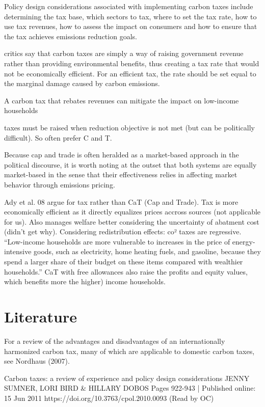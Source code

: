 \documentclass[version=3.21, pagesize, twoside=off, bibliography=totoc, DIV=calc, fontsize=12pt, a4paper, french, english]{scrartcl}
\begin{document}
Policy design considerations associated with implementing carbon taxes
include determining the tax base, which sectors to tax, where to set the tax rate, how to use tax
revenues, how to assess the impact on consumers and how to ensure that the tax achieves emissions
reduction goals.

critics say that carbon taxes are simply a way of raising government
revenue rather than providing environmental benefits, thus creating a tax rate that would not be economically efficient. For an efficient tax, the rate should be set equal to the marginal damage caused by
carbon emissions.

A carbon tax that rebates revenues can mitigate the impact on low-income households

taxes must be raised when reduction objective is not met (but can be politically difficult). So often prefer C and T.

Because cap and trade is often heralded as a market-based approach in the
political discourse, it is worth noting at the outset that both systems are equally market-based in
the sense that their effectiveness relies in affecting market behavior through emissions pricing.

Ady et al. 08 argue for tax rather than CaT (Cap and Trade). Tax is more economically efficient as it directly equalizes prices accross sources (not applicable for us). Also manages welfare better considering the uncertainty of abatment cost (didn’t get why). Considering redistribution effects: co² taxes are regressive. “Low-income households are more vulnerable to increases in the price of energy-intensive
goods, such as electricity, home heating fuels, and gasoline, because they spend a larger share of
their budget on these items compared with wealthier households.” CaT with free allowances also raise the profits and equity values, which benefits more the higher) income households.

\section{Literature}
For a review of
the advantages and disadvantages of an internationally harmonized carbon tax, many of which are
applicable to domestic carbon taxes, see Nordhaus (2007).

Carbon taxes: a review of experience and policy design considerations JENNY SUMNER, LORI BIRD \& HILLARY DOBOS Pages 922-943 | Published online: 15 Jun 2011 https://doi.org/10.3763/cpol.2010.0093 (Read by OC)
\end{document}
